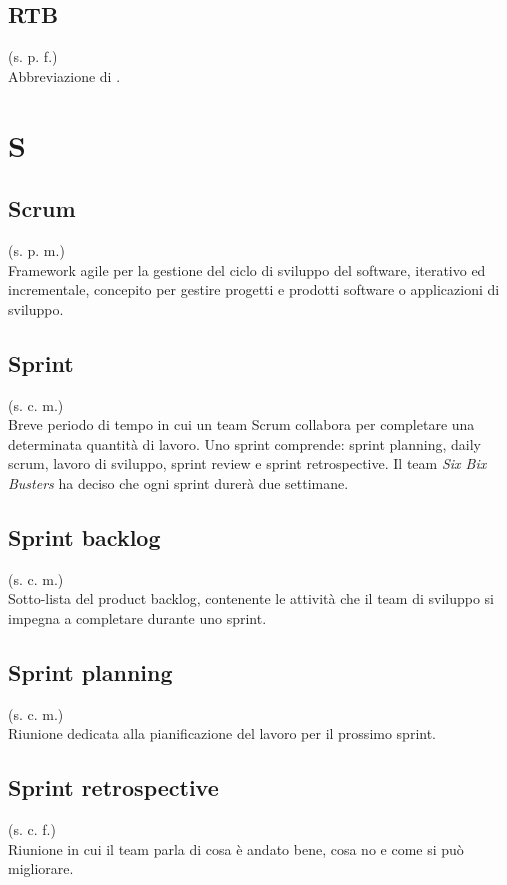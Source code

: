     \subsection{RTB}
    (s. p. f.)\\
    Abbreviazione di .
\pagebreak
\section{S}
    \subsection{Scrum}
    (s. p. m.)\\
    Framework agile per la gestione del ciclo di sviluppo del software, 
    iterativo ed incrementale, concepito per gestire progetti e prodotti software 
    o applicazioni di sviluppo.
    \subsection{Sprint}
    \label{Sprint}
    (s. c. m.)\\
    Breve periodo di tempo in cui un team Scrum collabora per completare 
    una determinata quantità di lavoro. Uno sprint comprende:  
    sprint planning, daily scrum, lavoro di sviluppo, 
    sprint review e sprint retrospective. Il team \textit{Six Bix Busters} ha 
    deciso che ogni sprint durerà due settimane.
    \subsection{Sprint backlog}   
    \label{Sprint backlog}
    (s. c. m.)\\
    Sotto-lista del product backlog, contenente le attività che il team di sviluppo 
    si impegna a completare durante uno sprint.
    \subsection{Sprint planning}
    (s. c. m.)\\
    Riunione dedicata alla pianificazione del lavoro per il prossimo sprint. 
    \subsection{Sprint retrospective}
    \label{Sprint retrospective}
    (s. c. f.)\\
    Riunione in cui il team parla di cosa è andato bene, cosa no e come si può migliorare.

